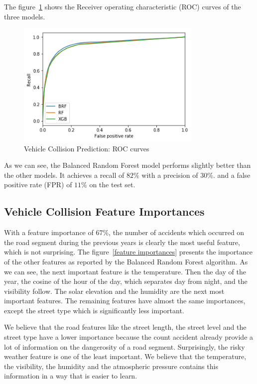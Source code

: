 \documentclass[conference]{IEEEtran}
\begin{document}
The figure~\ref{fig:roc} shows the Receiver operating characteristic (ROC) curves of the three models.

\begin{figure}[htbp]
\centerline{\includegraphics[height=6cm, keepaspectratio]{figures/roc.png}}
\caption{Vehicle Collision Prediction: ROC curves}
\label{fig:roc}
\end{figure}

As we can see, the Balanced Random Forest model performs slightly better than the other models.
It achieves a recall of $82\%$ with a precision of $30\%$. and a false positive rate (FPR) of $11\%$ on the test set.

\subsection{Vehicle Collision Feature Importances}
With a
feature importance of $67\%$, the number of accidents which occurred on the
road segment during the previous years is clearly the most useful feature, which
is not surprising. The figure~\ref{feature importances} presents the
importance of the other features as reported by the Balanced Random Forest
algorithm. As we can see, the next important feature is the temperature. 
Then the day of the year, the cosine of the hour of the day, which separates day from night,
and the visibility follow. The solar elevation and the humidity are the next most important features. The remaining features have almost the same importances, except the street type which
is significantly less important.

We believe that the road features like the street length, the street level and the street type have a lower importance because the count accident already provide a lot of information on the dangerosity of a road segment. Surprisingly, the risky weather feature is one of the least important. We believe that the temperature, the visibility, the humidity and the atmospheric pressure contains this information in a way that is easier to learn. 
\end{document}
